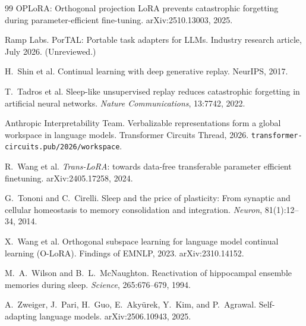 \documentclass[11pt]{article}
\begin{document}
\begin{thebibliography}{99}
 OPLoRA: Orthogonal projection LoRA prevents catastrophic forgetting during parameter-efficient fine-tuning. arXiv:2510.13003, 2025.

 Ramp Labs. PorTAL: Portable task adapters for LLMs. Industry research article, July 2026. (Unreviewed.)

 H.\ Shin et al. Continual learning with deep generative replay. NeurIPS, 2017.

 T.\ Tadros et al. Sleep-like unsupervised replay reduces catastrophic forgetting in artificial neural networks. \textit{Nature Communications}, 13:7742, 2022.

 Anthropic Interpretability Team. Verbalizable representations form a global workspace in language models. Transformer Circuits Thread, 2026. \texttt{transformer-circuits.pub/2026/workspace}.

 R.\ Wang et al. \textit{Trans-LoRA}: towards data-free transferable parameter efficient finetuning. arXiv:2405.17258, 2024.

 G.\ Tononi and C.\ Cirelli. Sleep and the price of plasticity: From synaptic and cellular homeostasis to memory consolidation and integration. \textit{Neuron}, 81(1):12--34, 2014.

 X.\ Wang et al. Orthogonal subspace learning for language model continual learning (O-LoRA). Findings of EMNLP, 2023. arXiv:2310.14152.

 M.\ A.\ Wilson and B.\ L.\ McNaughton. Reactivation of hippocampal ensemble memories during sleep. \textit{Science}, 265:676--679, 1994.

 A.\ Zweiger, J.\ Pari, H.\ Guo, E.\ Aky\"urek, Y.\ Kim, and P.\ Agrawal. Self-adapting language models. arXiv:2506.10943, 2025.

\end{thebibliography}
\end{document}
